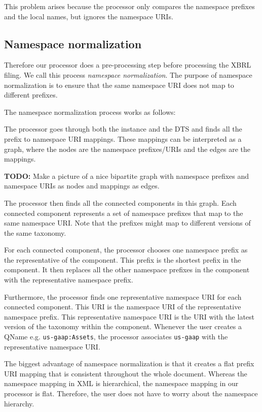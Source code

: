 This problem arises because the processor only compares the namespace prefixes and the local names, but ignores the namespace URIs.

\subsection{Namespace normalization}

Therefore our processor does a pre-processing step before processing the XBRL filing. We call this process \textit{namespace normalization}.
The purpose of namespace normalization is to ensure that the same namespace URI does not map to different prefixes.

The namespace normalization process works as follows:

The processor goes through both the instance and the DTS and finds all the prefix to namespace URI mappings. 
These mappings can be interpreted as a graph, where the nodes are the namespace prefixes/URIs and the edges are the mappings.

\textbf{TODO:} Make a picture of a nice bipartite graph with namespace prefixes and namespace URIs as nodes and mappings as edges.

The processor then finds all the connected components in this graph. 
Each connected component represents a set of namespace prefixes that map to the same namespace URI. 
Note that the prefixes might map to different versions of the same taxonomy.

For each connected component, the processor chooses one namespace prefix as the representative of the component.
This prefix is the shortest prefix in the component.
It then replaces all the other namespace prefixes in the component with the representative namespace prefix.

Furthermore, the processor finds one representative namespace URI for each connected component.
This URI is the namespace URI of the representative namespace prefix. 
This representative namespace URI is the URI with the latest version of the taxonomy within the component.
Whenever the user creates a QName e.g. \texttt{us-gaap:Assets}, the processor associates \texttt{us-gaap} with the representative namespace URI.

The biggest advantage of namespace normalization is that it creates a flat prefix URI mapping that is consistent throughout the whole document. 
Whereas the namespace mapping in XML is hierarchical, the namespace mapping in our processor is flat. 
Therefore, the user does not have to worry about the namespace hierarchy.

